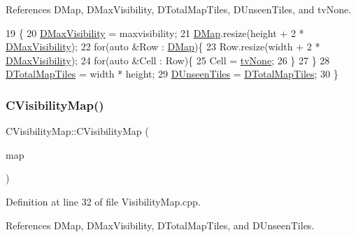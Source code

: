 References D\+Map, D\+Max\+Visibility, D\+Total\+Map\+Tiles, D\+Unseen\+Tiles, and tv\+None.


\begin{DoxyCode}
19                                                                       \{
20     \hyperlink{classCVisibilityMap_ac8f71b9541c903fce0294d75daa1bbb1}{DMaxVisibility} = maxvisibility;
21     \hyperlink{classCVisibilityMap_ad217bc34f7a50dd357a3eeeb69cfdd85}{DMap}.resize(height + 2 * \hyperlink{classCVisibilityMap_ac8f71b9541c903fce0294d75daa1bbb1}{DMaxVisibility});
22     \textcolor{keywordflow}{for}(\textcolor{keyword}{auto} &Row : \hyperlink{classCVisibilityMap_ad217bc34f7a50dd357a3eeeb69cfdd85}{DMap})\{
23         Row.resize(width + 2 * \hyperlink{classCVisibilityMap_ac8f71b9541c903fce0294d75daa1bbb1}{DMaxVisibility});
24         \textcolor{keywordflow}{for}(\textcolor{keyword}{auto} &Cell : Row)\{
25             Cell = \hyperlink{classCVisibilityMap_a6665f905da08825adbb0eee7bd1f2f30aec106086bdc6328c8c6c02ee1bf32d2c}{tvNone};   
26         \}
27     \}
28     \hyperlink{classCVisibilityMap_a9bd6e633268535677aeefbd886c29485}{DTotalMapTiles} = width * height;
29     \hyperlink{classCVisibilityMap_a117ff39fef73ffd4cc4ba35c35e63171}{DUnseenTiles} = \hyperlink{classCVisibilityMap_a9bd6e633268535677aeefbd886c29485}{DTotalMapTiles}; 
30 \}
\end{DoxyCode}
\hypertarget{classCVisibilityMap_ad0a772b55a6ca65d2038a3d9a2f5c945}{}\label{classCVisibilityMap_ad0a772b55a6ca65d2038a3d9a2f5c945} 
\subsubsection{\texorpdfstring{C\+Visibility\+Map()}{CVisibilityMap()}\hspace{0.1cm}{\footnotesize\ttfamily [2/2]}}
{\footnotesize\ttfamily C\+Visibility\+Map\+::\+C\+Visibility\+Map (\begin{DoxyParamCaption}\item[{const \hyperlink{classCVisibilityMap}{C\+Visibility\+Map} \&}]{map }\end{DoxyParamCaption})}



Definition at line 32 of file Visibility\+Map.\+cpp.



References D\+Map, D\+Max\+Visibility, D\+Total\+Map\+Tiles, and D\+Unseen\+Tiles.


